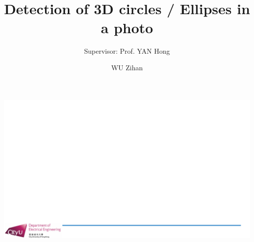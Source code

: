 \documentclass[aspectratio=169]{beamer}
\title{Detection of 3D circles / Ellipses in a photo}
\author{WU Zihan}
\subtitle{Supervisor: Prof. YAN Hong}
\begin{document}
{\includegraphics[width=\paperwidth]{EE8001 Presentation Template.pdf}} 
    \maketitle
\end{document}
